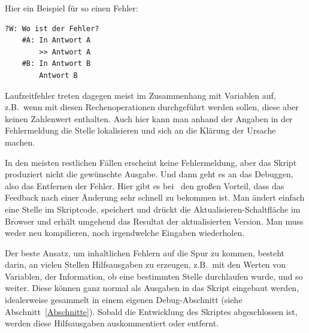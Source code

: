 Hier ein Beispiel für so einen Fehler:

\begin{verbatim}
?W: Wo ist der Fehler?
    #A: In Antwort A
        >> Antwort A
    #B: In Antwort B
        Antwort B
\end{verbatim}

Laufzeitfehler treten dagegen meist im Zusammenhang mit Variablen auf, z.B.\ wenn mit diesen Rechenoperationen durchgeführt werden sollen, diese aber keinen Zahlenwert enthalten. Auch hier kann man anhand der Angaben in der Fehlermeldung die Stelle lokalisieren und sich an die Klärung der Ursache machen.

In den meisten restlichen Fällen erscheint keine Fehlermeldung, aber das Skript produziert nicht die gewünschte Ausgabe. Und dann geht es an das Debuggen, also das Entfernen der Fehler. Hier gibt es bei \FPZ\ den großen Vorteil, dass das Feedback nach einer Änderung sehr schnell zu bekommen ist. Man ändert einfach eine Stelle im Skriptcode, speichert und drückt die Aktualisieren-Schaltfläche im Browser und erhält umgehend das Resultat der aktualisierten Version. Man muss weder neu kompilieren, noch irgendwelche Eingaben wiederholen.

Der beste Ansatz, um inhaltlichen Fehlern auf die Spur zu kommen, besteht darin, an vielen Stellen Hilfsausgaben zu erzeugen, z.B.\ mit den Werten von Variablen, der Information, ob eine bestimmten Stelle durchlaufen wurde, und so weiter. Diese können ganz normal als Ausgaben in das Skript eingebaut werden, idealerweise gesammelt in einem eigenen Debug-Abschnitt (siehe Abschnitt~\ref{Abschnitte}). Sobald die Entwicklung des Skriptes abgeschlossen ist, werden diese Hilfsausgaben auskommentiert oder entfernt.

